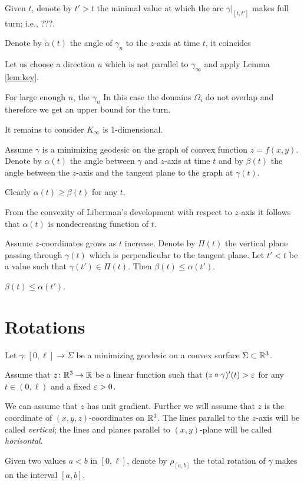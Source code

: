 \documentclass[a4paper,10pt]{amsart}
\begin{document}
Given $t$, denote by $t'>t$ the minimal value at which the arc $\gamma|_{[t,t']}$ makes full turn; i.e., ???.

Denote by $\tilde\alpha(t)$ the angle of $\gamma_n$ to the $z$-axis at time $t$,
it coincides 


Let us choose a direction $u$ 
which is not parallel to $\gamma_\infty$ and apply Lemma \ref{lem:key}.

For large enough $n$, 
the $\gamma_n$ 
In this case the domains $\Omega_i$ do not overlap and therefore we get an upper bound for the turn.

It remains to consider  $K_\infty$ is 1-dimensional.

Assume $\gamma$ is a minimizing geodesic on the graph of convex function $z=f(x,y)$.
Denote by $\alpha(t)$ the angle between $\gamma$ and $z$-axis at time $t$
and by $\beta(t)$ the angle between the $z$-axis and the tangent plane to the graph at $\gamma(t)$.

Clearly $\alpha(t)\ge \beta(t)$ for any $t$.

From the convexity of Liberman's development with respect to $z$-axis it follows that $\alpha(t)$ is nondecreasing function of $t$.

Assume $z$-coordinates grows as $t$ increase.
Denote by $\Pi(t)$ the vertical plane passing through $\gamma(t)$ which is perpendicular to the tangent plane.
Let $t'<t$ be a value such that $\gamma(t')\in \Pi(t)$.
Then $\beta(t)\le \alpha(t')$.

$\beta(t)\le \alpha(t')$.

\section{Rotations}

Let $\gamma:[0,\ell]\to \Sigma$ be a minimizing geodesic on a convex surface $\Sigma\subset \mathbb{R}^3$.

Assume that $z\colon\mathbb{R}^3\to\mathbb{R}$ be a linear function such that
$(z\circ\gamma)'(t)>\varepsilon$ for any $t\in (0,\ell)$ and a fixed $\varepsilon>0$.

We can assume that $z$ has unit gradient.
Further we will assume that $z$ is the coordinate 
of $(x,y,z)$-coordinates on $\mathbb{R}^3$.
The lines parallel to the $z$-axis will be called \emph{vertical};
the lines and planes parallel to $(x,y)$-plane will be called \emph{horisontal}.

Given two values $a<b$ in $[0,\ell]$,
denote by $\rho_{[a,b]}$ the total rotation of $\gamma$ makes on the interval $[a,b]$.
\end{document}
